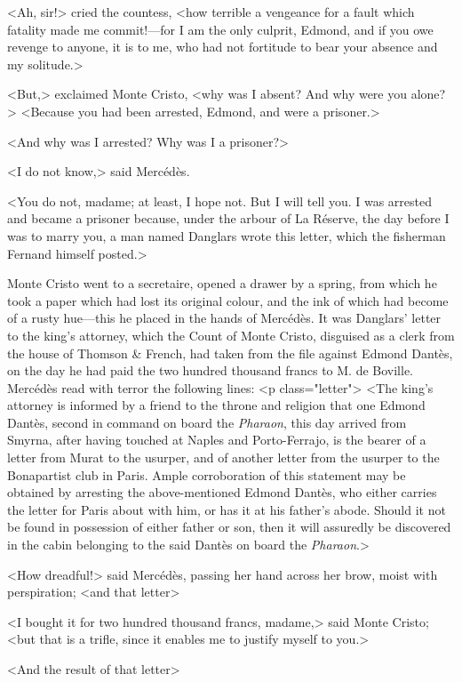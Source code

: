  <Ah, sir!> cried the countess, <how terrible a vengeance for a fault which fatality made me commit!—for I am the only culprit, Edmond, and if you owe revenge to anyone, it is to me, who had not fortitude to bear your absence and my solitude.> 

 <But,> exclaimed Monte Cristo, <why was I absent? And why were you alone?>  <Because you had been arrested, Edmond, and were a prisoner.> 

 <And why was I arrested? Why was I a prisoner?> 

 <I do not know,> said Mercédès. 

 <You do not, madame; at least, I hope not. But I will tell you. I was arrested and became a prisoner because, under the arbour of La Réserve, the day before I was to marry you, a man named Danglars wrote this letter, which the fisherman Fernand himself posted.> 

 Monte Cristo went to a secretaire, opened a drawer by a spring, from which he took a paper which had lost its original colour, and the ink of which had become of a rusty hue—this he placed in the hands of Mercédès. It was Danglars' letter to the king's attorney, which the Count of Monte Cristo, disguised as a clerk from the house of Thomson \& French, had taken from the file against Edmond Dantès, on the day he had paid the two hundred thousand francs to M. de Boville. Mercédès read with terror the following lines:  <p class="letter"> <The king's attorney is informed by a friend to the throne and religion that one Edmond Dantès, second in command on board the \textit{Pharaon}, this day arrived from Smyrna, after having touched at Naples and Porto-Ferrajo, is the bearer of a letter from Murat to the usurper, and of another letter from the usurper to the Bonapartist club in Paris. Ample corroboration of this statement may be obtained by arresting the above-mentioned Edmond Dantès, who either carries the letter for Paris about with him, or has it at his father's abode. Should it not be found in possession of either father or son, then it will assuredly be discovered in the cabin belonging to the said Dantès on board the \textit{Pharaon}.> 

 <How dreadful!> said Mercédès, passing her hand across her brow, moist with perspiration; <and that letter\longdash> 

 <I bought it for two hundred thousand francs, madame,> said Monte Cristo; <but that is a trifle, since it enables me to justify myself to you.> 

 <And the result of that letter\longdash> 

